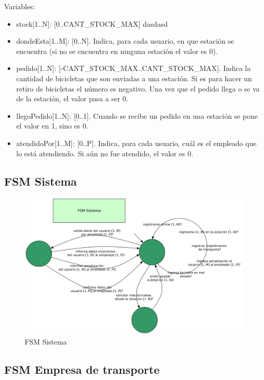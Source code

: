 Variables:
\begin{itemize}
\item stock[1..N]: [0..CANT\_STOCK\_MAX]
dasdasd
\item dondeEsta[1..M]: [0..N]. Indica, para cada usuario, en que estaci\'on se encuentra (si no se encuentra en ninguna estaci\'on el valor es 0).
\item pedido[1..N]: [-CANT\_STOCK\_MAX..CANT\_STOCK\_MAX]. Indica la cantidad de bicicletas que son enviadas a una estaci\'on. Si es para hacer un retiro de bicicletas el n\'umero es negativo. Una vez que el pedido llega o se va de la estaci\'on, el valor pasa a ser 0.
\item llegoPedido[1..N]: [0..1]. Cuando se recibe un pedido en una estaci\'on se pone el valor en 1, sino es 0.
\item atendidoPor[1..M]: [0..P]. Indica, para cada usuario, cu\'al es el empleado que lo est\'a atendiendo. Si a\'un no fue atendido, el valor es 0.
\end{itemize}

\subsection{FSM Sistema}

\begin{figure}[H]
	\centering
	\includegraphics[scale=0.3]{imgs/fsm_sistema.png}
	\caption{FSM Sistema}
\end{figure}

\subsection{FSM Empresa de transporte}

